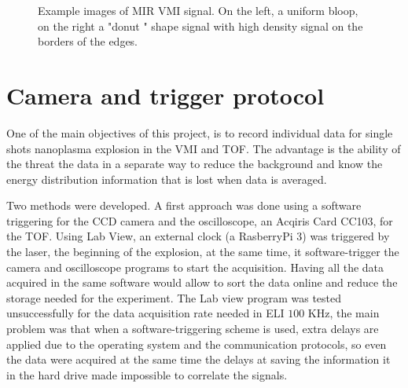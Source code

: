 \begin{figure}[h!]
\centering
{} 
\caption[VMI raw images example]{Example images of MIR VMI signal. On the left, a uniform bloop, on the right a "donut " shape signal with high density signal on the borders of the edges. }
\label{fig:vmiexample}
\end{figure}



\section{Camera and trigger protocol}

One of the main objectives of this project, is to record individual data for single shots nanoplasma explosion in the VMI and TOF. The advantage is the ability of the threat the data in a separate way to reduce the background and know the energy distribution information that is lost when data is averaged.

Two methods were developed. A first approach was done using a software triggering for the CCD camera and the oscilloscope, an Acqiris Card CC103, for the TOF. Using Lab View, an external clock (a RasberryPi 3) was triggered by the laser, the beginning of the explosion, at the same time, it software-trigger the camera and oscilloscope programs to start the acquisition. Having all the data acquired in the same software would allow to sort the data online and reduce the storage needed for the experiment. The Lab view program was tested unsuccessfully for the data acquisition rate needed in ELI $100$ KHz, the main problem was that when a software-triggering scheme is used, extra delays are applied due to the operating system and the communication protocols, so even the data were acquired at the same time the delays at saving the information it in the hard drive made impossible to correlate the signals.

